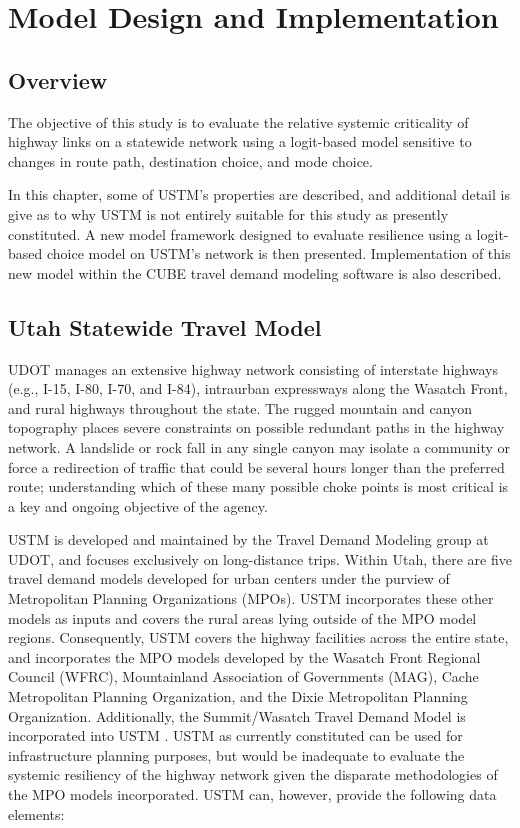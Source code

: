\chapter{Model Design and Implementation}
\label{chp:chapter3}
\graphicspath{{figures/}{figures/chapter3/}}

\section{Overview} \label{Overview}

The objective of this study is to evaluate the relative systemic
criticality of highway links on a statewide network using a logit-based model
sensitive to changes in route path, destination choice, and mode choice.

In this chapter, some of USTM's properties are described, and additional detail is give as to why
USTM is not entirely suitable for this study as presently constituted. A new model framework designed to evaluate resilience using a logit-based choice model on
USTM's network is then presented. Implementation of this new model within the CUBE travel demand
modeling software is also described.

\section{Utah Statewide Travel Model} \label{Utah Statewide Travel Model}

UDOT manages an extensive highway
network consisting of interstate highways (e.g., I-15, I-80, I-70, and I-84),
intraurban expressways along the Wasatch Front, and rural highways throughout
the state. The rugged mountain and canyon topography places
severe constraints on possible redundant paths in the highway network. A
landslide or rock fall in any single canyon may isolate a community or force a
redirection of traffic that could be several hours longer than the preferred
route; understanding which of these many possible choke points is most
critical is a key and ongoing objective of the agency.

USTM is developed and maintained by
the Travel Demand Modeling group at UDOT, and focuses exclusively on
long-distance trips. Within Utah, there are five travel
demand models developed for urban centers under the purview of  Metropolitan
Planning Organizations (MPOs). USTM incorporates these other models as inputs and covers
the rural areas lying outside of the MPO model regions. Consequently, USTM covers the
highway facilities across the entire state, and incorporates the MPO models
developed by the Wasatch Front Regional Council (WFRC), Mountainland
Association of Governments (MAG), Cache Metropolitan Planning Organization, and the Dixie Metropolitan Planning Organization. Additionally,
the Summit/Wasatch Travel Demand Model is incorporated into USTM \citep{udot2021}.
USTM as currently
constituted can be used for infrastructure planning purposes, but would be
inadequate to evaluate the systemic resiliency of the highway network given
the disparate methodologies of the MPO models incorporated. USTM can, however, provide the
following data elements:

